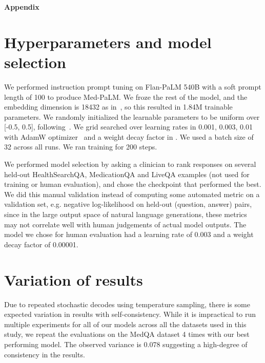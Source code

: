 \clearpage
\onecolumn

\renewcommand{\thesection}{A.\arabic{section}}
\renewcommand{\thefigure}{A.\arabic{figure}}
\renewcommand{\thetable}{A.\arabic{table}} 
\renewcommand{\theequation}{A.\arabic{equation}} 

\setcounter{section}{0}
\setcounter{figure}{0}
\setcounter{table}{0}
\setcounter{equation}{0}


\noindent \textbf{\LARGE{Appendix}}\\
\normalfont










\section{Hyperparameters and model selection}
\label{appendix:model-selection}
We performed instruction prompt tuning on Flan-PaLM 540B with a soft prompt length of 100 to produce Med-PaLM. We froze the rest of the model, and the embedding dimension is 18432 as in~\citet{chowdhery2022palm}, so this resulted in 1.84M trainable parameters. We randomly initialized the learnable parameters to be uniform over [-0.5, 0.5], following~\citet{lester2021power}. We grid searched over learning rates in {0.001, 0.003, 0.01} with AdamW optimizer~\cite{loshchilov2017decoupled} and a weight decay factor in . We used a batch size of 32 across all runs. We ran training for 200 steps.

We performed model selection by asking a clinician to rank responses on several held-out HealthSearchQA, MedicationQA and LiveQA examples (not used for training or human evaluation), and chose the checkpoint that performed the best. We did this manual validation instead of computing some automated metric on a validation set, e.g. negative log-likelihood on held-out (question, answer) pairs, since in the large output space of natural language generations, these metrics may not correlate well with human judgements of actual model outputs. The model we chose for human evaluation had a learning rate of 0.003 and a weight decay factor of 0.00001.


\section{Variation of results}
\label{appendix:result-variation}

Due to repeated stochastic decodes using temperature sampling, there is some expected variation in results with self-consistency. While it is impractical to run multiple experiments for all of our models across all the datasets used in this study, we repeat the evaluations on the MedQA dataset 4 times with our best performing model. The observed variance is 0.078 suggesting a high-degree of consistency in the results.




